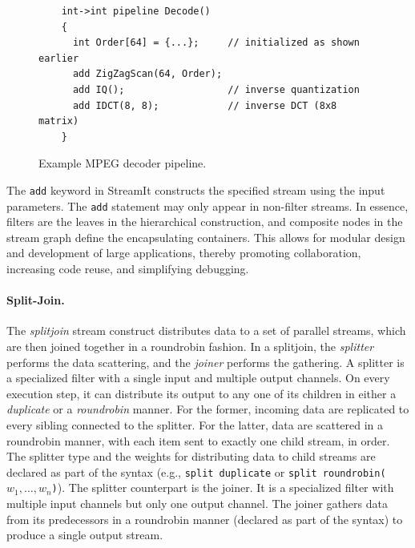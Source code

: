 \begin{figure}[t]
  \begin{scriptsize}
    \begin{verbatim}
	int->int pipeline Decode()
	{ 
	  int Order[64] = {...};     // initialized as shown earlier
	  add ZigZagScan(64, Order);
	  add IQ();                  // inverse quantization
	  add IDCT(8, 8);            // inverse DCT (8x8 matrix)
	}
    \end{verbatim}
  \end{scriptsize}
  \caption{Example MPEG decoder pipeline.}
  \label{fig:decoder-pipeline}
\end{figure}

The {\tt add} keyword in StreamIt constructs the specified stream
using the input parameters. The {\tt add} statement may only appear in
non-filter streams.  In essence, filters are the leaves in the
hierarchical construction, and composite nodes in the stream graph
define the encapsulating containers. This allows for modular design
and development of large applications, thereby  promoting
collaboration, increasing code reuse, and simplifying debugging.

\paragraph{Split-Join.}
The {\it splitjoin} stream construct distributes data to a set of
parallel streams, which are then joined together in a roundrobin
fashion. In a splitjoin, the {\it splitter} performs the data
scattering, and the {\it joiner} performs the gathering. A splitter is
a specialized filter with a single input and multiple output
channels. On  every execution step, it can distribute its output to
any one of its children in either a {\it duplicate} or a {\it
roundrobin} manner. For the former, incoming data are replicated to
every sibling connected to the splitter. For the latter, data are
scattered in a roundrobin manner, with each item sent to exactly one
child stream, in order. The splitter type and the weights for
distributing data to child streams are declared as part of the syntax
(e.g., \texttt{split duplicate} or \texttt{split
roundrobin($w_1,\ldots,w_n$)}). The splitter counterpart is the
joiner. It is a specialized filter with  multiple input channels but
only one output channel. The joiner gathers data from its predecessors
in a roundrobin manner (declared as part of the syntax) to produce a
single output stream.

